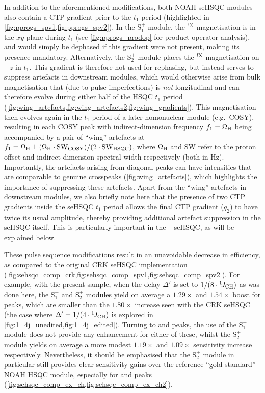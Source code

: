 \documentclass[11pt]{article}
\newcommand*{\noahSpa}{S$^+_1$}
\newcommand*{\noahSpb}{S$^+_2$}
\newcommand*{\proton}{\ce{^{1}H}}
\newcommand*{\nitrogen}{\ce{^{15}N}}
\newcommand*{\onejch}{{}^{1}\!J_{\ce{CH}}}
\newcommand*{\magnnot}[1]{\ce{^1H}$^{!#1}$}
\begin{document}
\begin{refsection}
In addition to the aforementioned modifications, both NOAH seHSQC modules also contain a CTP gradient prior to the $t_1$ period (highlighted in \cref{fig:pprogs_spv1,fig:pprogs_spv2}).
In the \noahSpa{} module, the \magnnot{\ce{X}} magnetisation is in the $xy$-plane during $t_1$ (see \cref{fig:pprogs_prodop} for product operator analysis), and would simply be dephased if this gradient were not present, making its presence mandatory.
Alternatively, the \noahSpb{} module places the \magnnot{\ce{X}} magnetisation on $\pm z$ in $t_1$.
This gradient is therefore not used for rephasing, but instead serves to suppress artefacts in downstream modules, which would otherwise arise from bulk magnetisation that (due to pulse imperfections) is \textit{not} longitudinal and can therefore evolve during either half of the HSQC $t_1$ period (\cref{fig:wing_artefacts,fig:wing_artefacts2,fig:wing_gradients}).
This magnetisation then evolves again in the $t_1$ period of a later homonuclear module (e.g.\ COSY), resulting in each COSY peak with indirect-dimension frequency $f_1 = \Omega_{\ce{H}}$ being accompanied by a pair of ``wing'' artefacts at $f_1 = \Omega_{\ce{H}} \pm (\Omega_{\ce{H}}\cdot\mathrm{SW_{COSY}})/(2\cdot \mathrm{SW_{HSQC}})$, where $\Omega_{\ce{H}}$ and SW refer to the proton offset and indirect-dimension spectral width respectively (both in Hz).
Importantly, the artefacts arising from diagonal peaks can have intensities that are comparable to genuine crosspeaks (\cref{fig:wing_artefacts}), which highlights the importance of suppressing these artefacts.
Apart from the ``wing'' artefacts in downstream modules, we also briefly note here that the presence of two CTP gradients inside the seHSQC $t_1$ period allows the final CTP gradient ($g_2$) to have twice its usual amplitude, thereby providing additional artefact suppression in the seHSQC itself.
This is particularly important in the \nitrogen{}--\proton{} seHSQC, as will be explained below.

These pulse sequence modifications result in an unavoidable decrease in efficiency, as compared to the original CRK seHSQC implementation (\cref{fig:sehsqc_comp_crk,fig:sehsqc_comp_spv1,fig:sehsqc_comp_spv2}).
For example, with the present sample, when the delay $\Delta'$ is set to $1/(8\cdot\onejch)$ as was done here,\autocite{Schleucher1994JBNMR} the \noahSpa{} and \noahSpb{} modules yield on average a $1.29\times$ and $1.54\times$ boost for  peaks, which are smaller than the $1.80\times$ increase seen with the CRK seHSQC (the case where $\Delta' = 1/(4\cdot\onejch)$ is explored in \cref{fig:1_4j_unedited,fig:1_4j_edited}).
Turning to  and  peaks, the use of the \noahSpa{} module does not provide any enhancement for either of these, whilst the \noahSpb{} module yields on average a more modest $1.19\times$ and $1.09\times$ sensitivity increase respectively.
Nevertheless, it should be emphasised that the \noahSpb{} module in particular still provides clear sensitivity gains over the reference ``gold-standard'' NOAH HSQC module, especially for  and  peaks (\cref{fig:sehsqc_comp_ex_ch,fig:sehsqc_comp_ex_ch2}).


\end{refsection}
\end{document}
